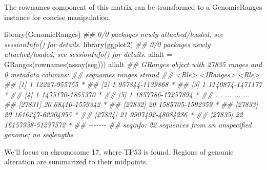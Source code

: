\documentclass[]{article}
\newcommand{\hlnum}[1]{\textcolor[rgb]{0.816,0.125,0.439}{#1}}%
\newcommand{\hlstr}[1]{\textcolor[rgb]{0.251,0.627,0.251}{#1}}%
\newcommand{\hlcom}[1]{\textcolor[rgb]{0.502,0.502,0.502}{\textit{#1}}}%
\newcommand{\hlopt}[1]{\textcolor[rgb]{0,0,0}{#1}}%
\newcommand{\hlstd}[1]{\textcolor[rgb]{0.251,0.251,0.251}{#1}}%
\newcommand{\hlkwc}[1]{\textcolor[rgb]{0.251,0.251,0.251}{#1}}%
\newcommand{\hlkwd}[1]{\textcolor[rgb]{0.878,0.439,0.125}{#1}}%
\newenvironment{Shaded}{\begin{myshaded}}{\end{myshaded}}
\newcommand{\KeywordTok}[1]{\hlkwd{#1}}
\newcommand{\DataTypeTok}[1]{\hlkwc{#1}}
\newcommand{\DecValTok}[1]{\hlnum{#1}}
\newcommand{\FloatTok}[1]{\hlnum{#1}}
\newcommand{\StringTok}[1]{\hlstr{#1}}
\newcommand{\CommentTok}[1]{\hlcom{#1}}
\newcommand{\OperatorTok}[1]{\hlopt{#1}}
\newcommand{\NormalTok}[1]{\hlstd{#1}}
\begin{document}
The rownames component of this matrix can be transformed to
a GenomicRanges instance for concise manipulation.

\begin{Shaded}
\begin{Highlighting}[]
\KeywordTok{library}\NormalTok{(GenomicRanges)}
\CommentTok{\#\# 0/0 packages newly attached/loaded, see sessionInfo() for details.}
\KeywordTok{library}\NormalTok{(ggplot2)}
\CommentTok{\#\# 0/0 packages newly attached/loaded, see sessionInfo() for details.}
\NormalTok{allalt =}\StringTok{ }\KeywordTok{GRanges}\NormalTok{(}\KeywordTok{rownames}\NormalTok{(}\KeywordTok{assay}\NormalTok{(seg)))}
\NormalTok{allalt}
\CommentTok{\#\# GRanges object with 27835 ranges and 0 metadata columns:}
\CommentTok{\#\#           seqnames            ranges strand}
\CommentTok{\#\#              \textless{}Rle\textgreater{}         \textless{}IRanges\textgreater{}  \textless{}Rle\textgreater{}}
\CommentTok{\#\#       [1]        1      12227{-}955755      *}
\CommentTok{\#\#       [2]        1    957844{-}1139868      *}
\CommentTok{\#\#       [3]        1   1140874{-}1471177      *}
\CommentTok{\#\#       [4]        1   1475170{-}1855370      *}
\CommentTok{\#\#       [5]        1  1857786{-}17257894      *}
\CommentTok{\#\#       ...      ...               ...    ...}
\CommentTok{\#\#   [27831]       20     68410{-}1559342      *}
\CommentTok{\#\#   [27832]       20   1585705{-}1592359      *}
\CommentTok{\#\#   [27833]       20  1616247{-}62904955      *}
\CommentTok{\#\#   [27834]       21  9907492{-}48084286      *}
\CommentTok{\#\#   [27835]       22 16157938{-}51237572      *}
\CommentTok{\#\#   {-}{-}{-}{-}{-}{-}{-}}
\CommentTok{\#\#   seqinfo: 22 sequences from an unspecified genome; no seqlengths}
\end{Highlighting}
\end{Shaded}

We'll focus on chromosome 17, where TP53 is found. Regions
of genomic alteration are summarized to their midpoints.

\begin{Shaded}
\end{Shaded}
\end{document}
